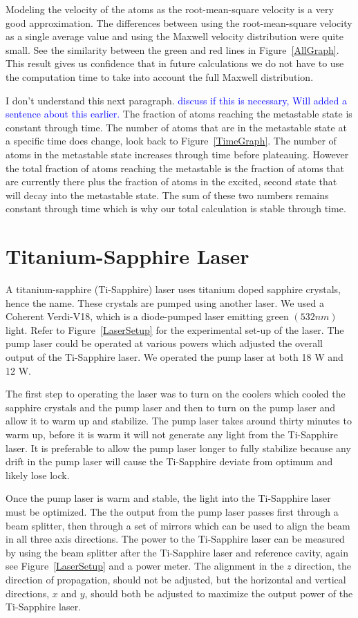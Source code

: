 \documentclass[prb,preprint]{revtex4-1}
\begin{document}
Modeling the velocity of the atoms as the root-mean-square velocity is a very good approximation. The differences between using the root-mean-square velocity as a single average value and using the Maxwell velocity distribution were quite small. See the similarity between the green and red lines in Figure~\ref{AllGraph}.  This result gives us confidence that in future calculations we do not have to use the computation time to take into account the full Maxwell distribution.

I don't understand this next paragraph. \textcolor{blue}{discuss if this is necessary, Will added a sentence about this earlier.}
The fraction of atoms reaching the metastable state is constant through time. The number of atoms that are in the metastable state at a specific time does change, look back to Figure~\ref{TimeGraph}. The number of atoms in the metastable state increases through time before plateauing. However the total fraction of atoms reaching the metastable is the fraction of atoms that are currently there plus the fraction of atoms in the excited, second state that will decay into the metastable state. The sum of these two numbers remains constant through time which is why our total calculation is stable through time.
  

\section{Titanium-Sapphire Laser}

A titanium-sapphire (Ti-Sapphire) laser uses titanium doped sapphire crystals, hence the name. These crystals are pumped using another laser. We used a Coherent Verdi-V18, which is a diode-pumped laser emitting green $(532nm)$ light. Refer to Figure~\ref{LaserSetup} for the experimental set-up of the laser. The pump laser could be operated at various powers which adjusted the overall output of the Ti-Sapphire laser. We operated the pump laser at both 18 W and 12 W.

The first step to operating the laser was to turn on the coolers which cooled the sapphire crystals and the pump laser and then to turn on the pump laser and allow it to warm up and stabilize. The pump laser takes around thirty minutes to warm up, before it is warm it will not generate any light from the Ti-Sapphire laser. It is preferable to allow the pump laser longer to fully stabilize because any drift in the pump laser will cause the Ti-Sapphire deviate from optimum and likely lose lock.

Once the pump laser is warm and stable, the light into the Ti-Sapphire laser must be optimized. The the output from the pump laser passes first through a beam splitter, then through a set of mirrors which can be used to align the beam in all three axis directions. The power to the Ti-Sapphire laser can be measured by using the beam splitter after the Ti-Sapphire laser and reference cavity, again see Figure~\ref{LaserSetup} and a power meter. The alignment in the $z$ direction, the direction of propagation, should not be adjusted, but the horizontal and vertical directions, $x$ and $y$, should both be adjusted to maximize the output power of the Ti-Sapphire laser. 
\end{document}
